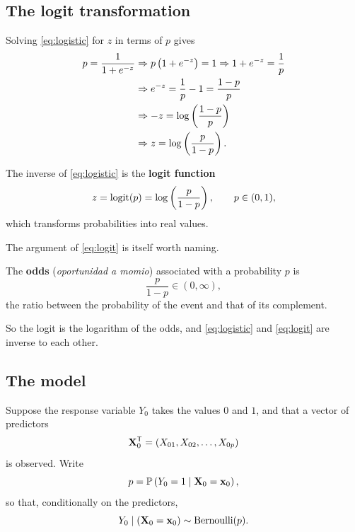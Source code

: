 \subsection{The logit transformation}
\label{subsec:logit}

Solving \eqref{eq:logistic} for $z$ in terms of $p$ gives
\begin{equation}
  \label{eq:logit_derivation}
  \begin{aligned}
    p=\frac{1}{1+e^{-z}}
      &\Rightarrow p\left( 1+e^{-z} \right)=1
       \Rightarrow 1+e^{-z}=\frac{1}{p}\\
      &\Rightarrow e^{-z}=\frac{1}{p}-1=\frac{1-p}{p}\\
      &\Rightarrow -z=\log\left( \frac{1-p}{p} \right)\\
      &\Rightarrow z=\log\left( \frac{p}{1-p} \right) .
  \end{aligned}
\end{equation}

\begin{definition}
  \label{def:logit}
  The inverse of \eqref{eq:logistic} is the \textbf{logit function}
  \begin{equation}
    \label{eq:logit}
    z=\operatorname{logit}(p)=\log\left( \frac{p}{1-p} \right),
    \qquad p\in(0,1),
  \end{equation}
  which transforms probabilities into real values.
\end{definition}

The argument of \eqref{eq:logit} is itself worth naming.

\begin{definition}[Odds]
  \label{def:odds}
  The \textbf{odds} (\emph{oportunidad a momio}) associated with a probability
  $p$ is
  \begin{equation}
    \label{eq:odds}
    \frac{p}{1-p}\in(0,\infty),
  \end{equation}
  the ratio between the probability of the event and that of its complement.
\end{definition}

So the logit is the logarithm of the odds, and \eqref{eq:logistic} and
\eqref{eq:logit} are inverse to each other.

\subsection{The model}
\label{subsec:logistic_model}

Suppose the response variable $Y_0$ takes the values $0$ and $1$, and that a
vector of predictors
\begin{equation}
  \label{eq:predictor_vector}
  \mathbf{X}_0^{\mathsf{T}}=(X_{01},X_{02},\dots,X_{0p})
\end{equation}
is observed. Write
\begin{equation}
  \label{eq:p_definition}
  p=\mathbb{P}\left( Y_0=1\mid\mathbf{X}_0=\mathbf{x}_0 \right),
\end{equation}
so that, conditionally on the predictors,
\begin{equation}
  \label{eq:bernoulli}
  Y_0\mid\left( \mathbf{X}_0=\mathbf{x}_0 \right)\sim\text{Bernoulli}(p).
\end{equation}

